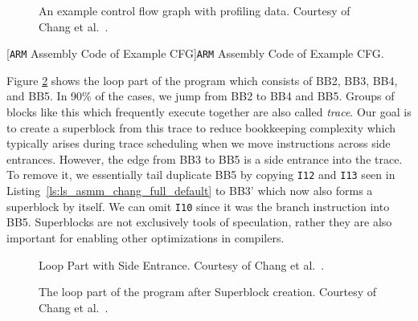 \clearpage
\begin{center}
    \begin{minipage}{.69\textwidth}
        \begin{figure}[H]
            \centering
            
            \caption[Example Control Flow Graph with Profiling Data]{An example control flow graph with profiling data. Courtesy of Chang et al.~\cite{chang95}.}
            \label{fig:controlflow_full}
\end{figure}
    \end{minipage}\hfill
    \begin{minipage}{.31\textwidth}
    
        \captionsetup{type=Listing}
        [\texttt{ARM} Assembly Code of Example CFG]{\texttt{ARM} Assembly Code of Example CFG.}
        \label{ls:ls_asmm_chang_full_default}
    \end{minipage}
\end{center} 


Figure \ref{fig:controlflow_side_enterance} shows the loop part of the program which consists of BB2, BB3, BB4, and BB5. In 90\% of the cases, we jump from BB2 to BB4 and BB5. Groups of blocks like this which frequently execute together are also called \textit{trace}. Our goal is to create a superblock from this trace to reduce bookkeeping complexity which typically arises during trace scheduling when we move instructions across side entrances. However, the edge from BB3 to BB5 is a side entrance into the trace. To remove it, we essentially tail duplicate BB5 by copying \texttt{I12} and \texttt{I13} seen in Listing~\ref{ls:ls_asmm_chang_full_default}  to BB3' which now also forms a superblock by itself. We can omit \texttt{I10} since it was the branch instruction into BB5. Superblocks are not exclusively tools of speculation, rather they are also important for enabling other optimizations in compilers. 

\begin{center}
    \begin{minipage}{.38\textwidth}
        \begin{figure}[H]
            \centering
            \resizebox{1\textwidth}{!}{
            
        }
        \caption[Loop Part with Side Entrance]{Loop Part with Side Entrance. Courtesy of Chang et al.~\cite{chang95}.}
        \label{fig:controlflow_side_enterance}
\end{figure}
    \end{minipage}\hfill
    \begin{minipage}{.58\textwidth}
    \begin{figure}[H]
        \centering
        \resizebox{1\textwidth}{!}{
            
        }
        \caption[Loop Part Superblock Example]{The loop part of the program after Superblock creation. Courtesy of Chang et al.~\cite{chang95}.}
        \label{fig:controlflow_superblock}
\end{figure}
    \end{minipage}
\end{center} 


